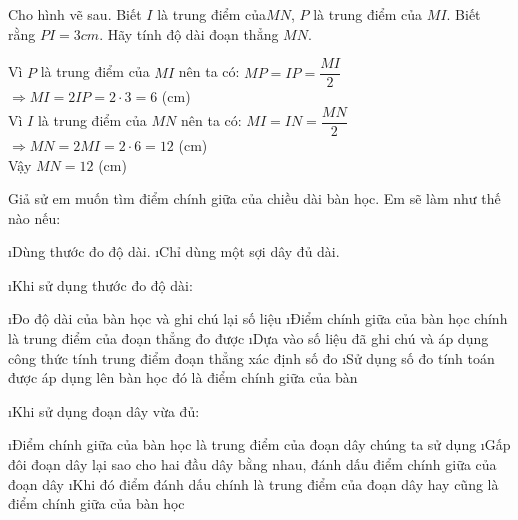 \begin{bt}
	Cho hình vẽ sau. Biết $I$ là trung điểm của$MN$, $P$ là trung điểm của $MI$. Biết rằng $PI=3cm$. Hãy tính độ dài đoạn thẳng $MN$.
	\begin{center}
	\end{center}
	\begin{loigiaichuong29}
		Vì $P$ là trung điểm của $MI$ nên ta có: $MP = IP = \dfrac{MI}{2}$\\
		$\Rightarrow MI = 2IP = 2\cdot 3 = 6$ (cm)\\
		Vì $I$ là trung điểm của $MN$ nên ta có: $MI = IN = \dfrac{MN}{2}$\\
		$\Rightarrow MN = 2MI = 2\cdot 6 = 12$ (cm)\\
		Vậy $MN = 12$ (cm)
	\end{loigiaichuong29}
\end{bt}
\begin{bt}
	Giả sử em muốn tìm điểm chính giữa của chiều dài bàn học. Em sẽ làm như thế nào nếu:
	\begin{enumerate}[a), leftmargin=*]
		\i Dùng thước đo độ dài.
		\i Chỉ dùng một sợi dây đủ dài.
	\end{enumerate}
	\begin{loigiaichuong29}
		\begin{enumerate}[a),leftmargin=*]
			\i Khi sử dụng thước đo độ dài:
			\begin{enumerate}[+,leftmargin=*]
				\i Đo độ dài của bàn học và ghi chú lại số liệu
				\i Điểm chính giữa của bàn học chính là trung điểm của đoạn thẳng đo được
				\i Dựa vào số liệu đã ghi chú và áp dụng công thức tính trung điểm đoạn thẳng xác định số đo
				\i Sử dụng số đo tính toán được áp dụng lên bàn học đó là điểm chính giữa của bàn
			\end{enumerate}
			\i Khi sử dụng đoạn dây vừa đủ:
			\begin{enumerate}[+,leftmargin=*]
				\i Điểm chính giữa của bàn học là trung điểm của đoạn dây chúng ta sử dụng
				\i Gấp đôi đoạn dây lại sao cho hai đầu dây bằng nhau, đánh dấu điểm chính giữa của đoạn dây
				\i Khi đó điểm đánh dấu chính là trung điểm của đoạn dây hay cũng là điểm chính giữa của bàn học
			\end{enumerate}
		\end{enumerate}
	\end{loigiaichuong29}
\end{bt}
